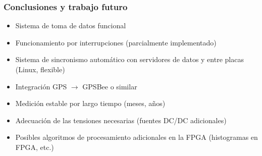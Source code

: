 \documentclass{beamer}
\begin{document}
\begin{frame}
\begin{columns}
\begin{column}{0.5\textwidth}
								\end{column}
				\end{columns}
\end{frame}

\begin{frame}
				\frametitle{Conclusiones y trabajo futuro}
				\begin{exampleblock}{}
								\begin{itemize}
												\item Sistema de toma de datos funcional 
												\item Funcionamiento por interrupciones (parcialmente	implementado)
												\item Sistema de sincronismo automático con servidores de datos y entre
																placas (Linux, flexible)
												\item Integración GPS $\to$ GPSBee o similar 
												\item Medición estable por largo tiempo (meses, años)
												\item Adecuación de las tensiones necesarias (fuentes
													DC/DC adicionales)
												\item Posibles algoritmos de procesamiento adicionales
													en la FPGA (histogramas en FPGA, etc.)
								\end{itemize}
				\end{exampleblock}
\end{frame}
\end{document}
